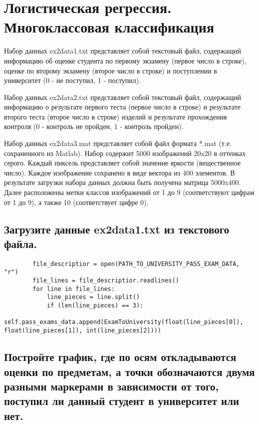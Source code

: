 







\section{Логистическая регрессия. Многоклассовая классификация}
\label{sec:purpose}

Набор данных ex2data1.txt представляет собой текстовый файл, содержащий информацию об оценке студента по первому экзамену (первое число в строке), оценке по второму экзамену (второе число в строке) и поступлении в университет (0 - не поступил, 1 - поступил).

Набор данных ex2data2.txt представляет собой текстовый файл, содержащий информацию о результате первого теста (первое число в строке) и результате второго теста (второе число в строке) изделий и результате прохождения контроля (0 - контроль не пройден, 1 - контроль пройден).

Набор данных ex2data3.mat представляет собой файл формата *.mat (т.е. сохраненного из Matlab). Набор содержит 5000 изображений 20x20 в оттенках серого. Каждый пиксель представляет собой значение яркости (вещественное число). Каждое изображение сохранено в виде вектора из 400 элементов. В результате загрузки набора данных должна быть получена матрица 5000x400. Далее расположены метки классов изображений от 1 до 9 (соответствуют цифрам от 1 до 9), а также 10 (соответствует цифре 0).


\subsection{Загрузите данные ex2data1.txt из текстового файла.}

\begin{lstlisting}
        file_descriptior = open(PATH_TO_UNIVERSITY_PASS_EXAM_DATA, "r")
        file_lines = file_descriptior.readlines()
        for line in file_lines:
            line_pieces = line.split()
            if (len(line_pieces) == 3):
                self.pass_exams_data.append(ExamToUniversity(float(line_pieces[0]), float(line_pieces[1]), int(line_pieces[2])))
\end{lstlisting}

\subsection{Постройте график, где по осям откладываются оценки по предметам, а точки обозначаются двумя разными маркерами в зависимости от того, поступил ли данный студент в университет или нет.}

